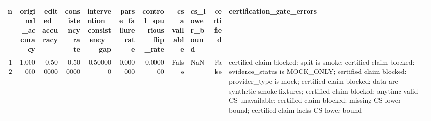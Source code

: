 \begin{tabular}{rrrrrrrrlrl}
\toprule
n & original_accuracy & edited_accuracy & consistency_rate & intervention_consistency_gap & parse_failure_rate & control_spurious_flip_rate & cs_available & cs_lower_bound & certified & certification_gate_errors \\
\midrule
12 & 1.000000 & 0.500000 & 0.500000 & 0.500000 & 0.000000 & 0.000000 & False & NaN & False & certified claim blocked: split is smoke; certified claim blocked: evidence_status is MOCK_ONLY; certified claim blocked: provider_type is mock; certified claim blocked: data are synthetic smoke fixtures; certified claim blocked: anytime-valid CS unavailable; certified claim blocked: missing CS lower bound; certified claim lacks CS lower bound \\
\bottomrule
\end{tabular}
